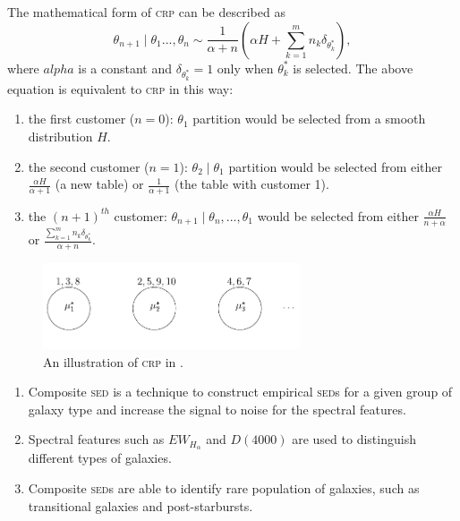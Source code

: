 \documentclass{ar-1col}
\begin{document}
The mathematical form of \textsc{crp} can be described as 
\begin{equation}
    \theta_{n+1} \mid \theta_1 ..., \theta_{n} \sim \frac{1}{\alpha + n} \left( \alpha H + \sum_{k = 1}^{m} n_k \delta_{\theta_{k}^*} \right),
    \label{eq:crp}
\end{equation}
where $alpha$ is a constant and $\delta_{\theta_k^*} = 1$ only when $\theta_k^*$ is selected.
The above equation is equivalent to \textsc{crp} in this way: 
\begin{enumerate}
    \item the first customer ($n = 0$): $\theta_1$ partition would be selected from a smooth distribution $H$.
    \item the second customer ($n = 1$): $\theta_2 \mid \theta_1$ partition would be selected from either $\frac{\alpha H}{\alpha + 1}$ (a new table) or $\frac{1}{\alpha + 1}$ (the table with customer 1).
    \item the $(n + 1)^{th}$ customer: $\theta_{n + 1} \mid \theta_n, ..., \theta_1$ would be selected from either $\frac{\alpha H}{n + \alpha}$ or $ \frac{\sum_{k = 1}^{m} n_k \delta_{\theta_k^*}}{\alpha + n} $.
\end{enumerate}


\begin{figure}
    \includegraphics[width=3in, height=1in]{images/chinese_restaurant.pdf}
    \caption{An illustration of \textsc{crp} in \citet{Blei2007}.}
    \label{fig:crp}
\end{figure}



\begin{summary}
    \begin{enumerate}
        \item Composite \textsc{sed} is a technique to construct empirical \textsc{sed}s for a given group of galaxy type and increase the signal to noise for the spectral features.
        \item Spectral features such as $EW_{H_\alpha}$ and $D(4000)$ are used to distinguish different types of galaxies.
        \item Composite \textsc{sed}s are able to identify rare population of galaxies, such as transitional galaxies and post-starbursts. 
    \end{enumerate}
\end{summary}    
\end{document}
